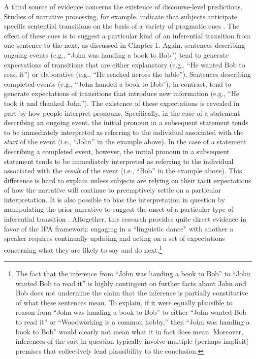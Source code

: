 A third source of evidence concerns the existence of discourse-level predictions. Studies of narrative processing, for example, indicate that subjects anticipate specific sentential transitions on the basis of a variety of pragmatic cues \citep[see][p. 13-17]{Rohde:2008}. The effect of these cues is to suggest a particular kind of an inferential transition from one sentence to the next, as discussed in Chapter 1. Again, sentences describing ongoing events (e.g., ``John was handing a book to Bob'') tend to generate expectations of transitions that are either explanatory (e.g., ``He wanted Bob to read it'') or elaborative (e.g., ``He reached across the table''). Sentences describing completed events (e.g., ``John handed a book to Bob''), in contrast, tend to generate expectations of transitions that introduce new information (e.g., ``He took it and thanked John''). The existence of these expectations is revealed in part by how people interpret pronouns. Specifically, in the case of a statement describing an ongoing event, the initial pronoun in a subsequent statement tends to be immediately interpreted as referring to the individual associated with the \textit{start} of the event (i.e., ``John'' in the example above). In the case of a statement describing a completed event, however, the initial pronoun in a subsequent statement tends to be immediately interpreted as referring to the individual associated with the \textit{result} of the event (i.e., ``Bob'' in the example above). This difference is hard to explain unless subjects are relying on their tacit expectations of how the narrative will continue to preemptively settle on a particular interpretation. It is also possible to bias the interpretation in question by manipulating the prior narrative to suggest the onset of a particular type of inferential transition \citep{Rohde:2008}. Altogether, this research provides quite direct evidence in favor of the IPA framework: engaging in a ``linguistic dance'' with another a speaker requires continually updating and acting on a set of expectations concerning what they are likely to say and do next.\footnote{The fact that the inference from ``John was handing a book to Bob'' to ``John wanted Bob to read it'' is highly contingent on further facts about John and Bob does not undermine the claim that the inference is partially constitutive of what these sentences mean. To explain, if it were equally plausible to reason from ``John was handing a book to Bob'' to either ``John wanted Bob to read it'' or ``Woodworking is a common hobby,'' then ``John was handing a book to Bob'' would clearly not mean what it in fact does mean. Moreover, inferences of the sort in question typically involve multiple (perhaps implicit) premises that collectively lend plausibility to the conclusion.}

